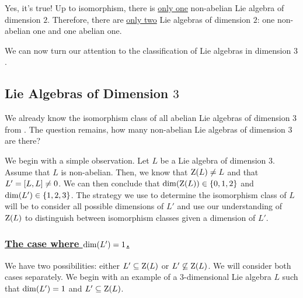 Yes, it's true! Up to isomorphism, there is \underline{only one} non-abelian Lie algebra of dimension $2$. Therefore, there are \underline{only two} Lie algebras of dimension $2$: one non-abelian one and one abelian one.

We can now turn our attention to the classification of Lie algebras in dimension $3$.

\subsection{Lie Algebras of Dimension $3$}

We already know the isomorphism class of all abelian Lie algebras of dimension $3$ from . The question remains, how many non-abelian Lie algebras of dimension $3$ are there?

We begin with a simple observation. Let $L$ be a Lie algebra of dimension $3$. Assume that $L$ is non-abelian. Then, we know that $\operatorname{Z}\!\left( L \right) \neq L$ and that $L' = \left[ L, L \right] \neq 0$. We can then conclude that $\dim\!\left( \operatorname{Z}\!\left( L \right) \right) \in \left\{ 0, 1, 2 \right\}$ and $\dim\!\left( L' \right) \in \left\{ 1, 2, 3 \right\}$. The strategy we use to determine the isomorphism class of $L$ will be to consider all possible dimensions of $L'$ and use our understanding of $\operatorname{Z}\!\left( L \right)$ to distinguish between isomorphism classes given a dimension of $L'$.

\subsubsection{\underline{The case where $\dim\!\left( L' \right) = 1$.}}

We have two possibilities: either $L' \subseteq \operatorname{Z}\!\left( L \right)$ or $L' \not\subseteq \operatorname{Z}\!\left( L \right)$. We will consider both cases separately. We begin with an example of a $3$-dimensional Lie algebra $L$ such that $\dim\!\left( L' \right) = 1$ and $L' \subseteq \operatorname{Z}\!\left( L \right)$.

